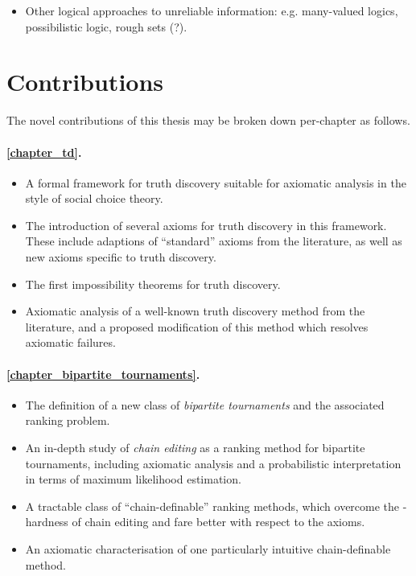 \begin{notes}
    \begin{itemize}
        \item Other logical approaches to unreliable information: e.g.
              many-valued logics, possibilistic logic, rough sets (?).
    \end{itemize}
\end{notes}

\section{Contributions}

The novel contributions of this thesis may be broken down per-chapter as
follows.

\paragraph{\cref{chapter_td}.}
\begin{itemize}
    \item A formal framework for truth discovery suitable for axiomatic
          analysis in the style of social choice theory.
    \item The introduction of several axioms for truth discovery in this
          framework. These include adaptions of ``standard'' axioms from the
          literature, as well as new axioms specific to truth discovery.
    \item The first impossibility theorems for truth discovery.
    \item Axiomatic analysis of a well-known truth discovery method from the
          literature, and a proposed modification of this method which resolves
          axiomatic failures.

\end{itemize}

\paragraph{\cref{chapter_bipartite_tournaments}.}
\begin{itemize}
    \item The definition of a new class of \emph{bipartite tournaments} and the
          associated ranking problem.
    \item An in-depth study of \emph{chain editing} as a ranking method for
          bipartite tournaments, including axiomatic analysis and a
          probabilistic interpretation in terms of maximum likelihood
          estimation.
    \item A tractable class of ``chain-definable'' ranking methods, which
          overcome the -hardness of chain editing and fare
          better with respect to the axioms.
    \item An axiomatic characterisation of one particularly intuitive
          chain-definable method.

\end{itemize}

